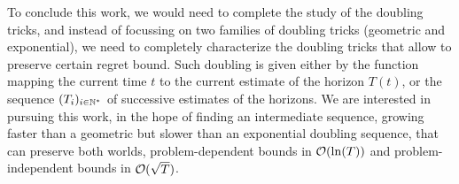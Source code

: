 To conclude this work, we would need to complete the study of the doubling tricks, and instead of focussing on two families of doubling tricks (geometric and exponential), we need to completely characterize the doubling tricks that allow to preserve certain regret bound.
Such doubling is given either by the function mapping the current time $t$ to the current estimate of the horizon $T(t)$, or the sequence $(T_i)_{i\in\mathbb{N}^*}$ of successive estimates of the horizons.
We are interested in pursuing this work, in the hope of finding an intermediate sequence, growing faster than a geometric but slower than an exponential doubling sequence, that can preserve both worlds, problem-dependent bounds in $\mathcal{O}(\ln(T))$ and problem-independent bounds in $\mathcal{O}(\sqrt{T})$.
